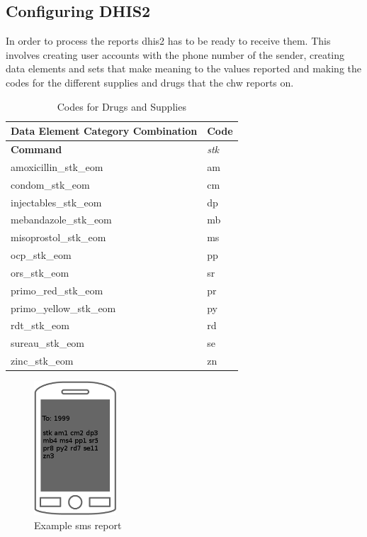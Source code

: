 \subsection{Configuring DHIS2}
In order to process the reports \gls{dhis2} has to be ready to receive them.
This involves creating user accounts with the phone number of the sender, creating data elements and sets that make meaning to the values reported and making the codes for the different supplies and drugs that the \gls{chw} reports on. 

\begin{table}
\centering
\begin{tabular}{l l}

\textbf{Data Element Category Combination} &	\textbf{Code} \\
\hline
\textbf{Command} & \textit{stk} \\
amoxicillin\_stk\_eom &	am\\
condom\_stk\_eom & cm\\
injectables\_stk\_eom &	dp\\
mebandazole\_stk\_eom &	mb\\
misoprostol\_stk\_eom &	ms\\
ocp\_stk\_eom &	pp\\
ors\_stk\_eom &	sr\\
primo\_red\_stk\_eom &	pr\\
primo\_yellow\_stk\_eom & py\\
rdt\_stk\_eom &	rd\\
sureau\_stk\_eom & se\\
zinc\_stk\_eom & zn \\
\hline
\end{tabular}
\caption{Codes for Drugs and Supplies}
\label{tab:codesDS}
\end{table}

\begin{figure}
\centering
\includegraphics[height=5cm]{case/img/smsExample}
\caption{Example \gls{sms} report}
\label{fig:exsms}
\end{figure}

